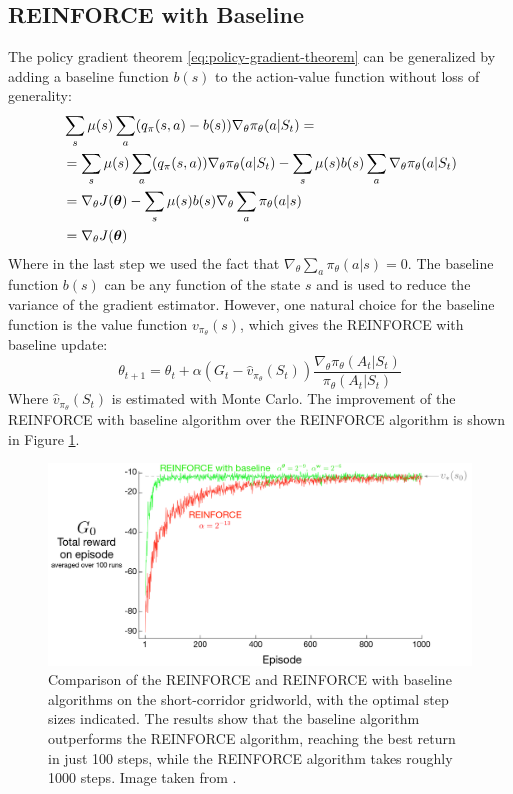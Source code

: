 \subsection{REINFORCE with Baseline}
The policy gradient theorem \eqref{eq:policy-gradient-theorem} can be generalized by adding a baseline function $b(s)$ to the action-value function without loss of generality:
\begin{equation}
    \begin{split}
        & \sum_s \mu(s) \sum_a (q_{\pi}(s, a) - b(s)) \nabla_{\theta}\pi_{\theta}(a|S_t) = \\
        & = \sum_s \mu(s) \sum_a (q_{\pi}(s, a)) \nabla_{\theta}\pi_{\theta}(a|S_t) - \sum_s \mu(s) b(s) \sum_a \nabla_{\theta}\pi_{\theta}(a|S_t)\\
        & = \nabla_{\theta} J(\boldsymbol{\theta}) - \sum_s \mu(s) b(s) \nabla_{\theta} \sum_a \pi_{\theta}(a|s)\\
        & = \nabla_{\theta} J(\boldsymbol{\theta})
    \end{split}
    \label{eq:policy-gradient-theorem-generalized}
\end{equation}
Where in the last step we used the fact that $\nabla_{\theta} \sum_a \pi_{\theta}(a|s) = 0$. The baseline function $b(s)$ can be any function of the state $s$ and is used to reduce the variance of the gradient estimator. However, one natural choice for the baseline function is the value function $v_{\pi_{\theta}}(s)$, which gives the REINFORCE with baseline update:
\begin{equation}
    \theta_{t+1} = \theta_t + \alpha (G_t - \hat{v}_{\pi_{\theta}}(S_t)) \frac{\nabla_{\theta} \pi_{\theta}(A_t|S_t)}{\pi_{\theta}(A_t|S_t)}
    \label{eq:reinforce-with-baseline-update}
\end{equation}
Where $\hat{v}_{\pi_{\theta}}(S_t)$ is estimated with Monte Carlo. The improvement of the REINFORCE with baseline algorithm over the REINFORCE algorithm is shown in Figure \ref{fig:reinforce-comparison}.
\begin{figure}[H]
    \centering
    \includegraphics[width=\linewidth]{images/reinforce-comparison.png}
    \caption{Comparison of the REINFORCE and REINFORCE with baseline algorithms on the short-corridor gridworld, with the optimal step sizes indicated. The results show that the baseline algorithm outperforms the REINFORCE algorithm, reaching the best return in just 100 steps, while the REINFORCE algorithm takes roughly 1000 steps. Image taken from \cite{sutton-barto}.}
    \label{fig:reinforce-comparison}
\end{figure}

